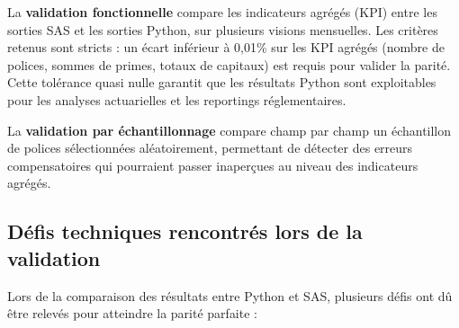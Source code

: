 La \textbf{validation fonctionnelle} compare les indicateurs agrégés (KPI) entre les sorties SAS et les sorties Python, sur plusieurs visions mensuelles. Les critères retenus sont stricts : un écart inférieur à 0,01\% sur les KPI agrégés (nombre de polices, sommes de primes, totaux de capitaux) est requis pour valider la parité. Cette tolérance quasi nulle garantit que les résultats Python sont exploitables pour les analyses actuarielles et les reportings réglementaires.

La \textbf{validation par échantillonnage} compare champ par champ un échantillon de polices sélectionnées aléatoirement, permettant de détecter des erreurs compensatoires qui pourraient passer inaperçues au niveau des indicateurs agrégés.

\subsection{Défis techniques rencontrés lors de la validation}

Lors de la comparaison des résultats entre Python et SAS, plusieurs défis ont d\^u être relevés pour atteindre la parité parfaite :

